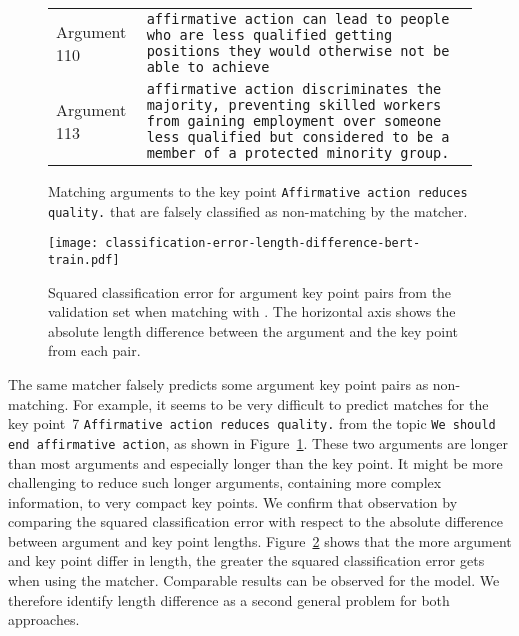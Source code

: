 \begin{figure}
    \begin{tabularx}{\linewidth}{@{}p{4em}X@{}}
        Argument 110 & \texttt{affirmative action can lead to people who are less qualified getting positions they would otherwise not be able to achieve} \\
        Argument 113 & \texttt{affirmative action discriminates the majority, preventing skilled workers from gaining employment over someone less qualified but considered to be a member of a protected minority group.}
    \end{tabularx}
    \caption{Matching arguments to the key point \texttt{Affirmative action reduces quality.} that are falsely classified as non-matching by the \BertBase matcher.}
    \label{example-5-110-113}
\end{figure}
\begin{figure}
    \texttt{[image: classification-error-length-difference-bert-train.pdf]}
    \caption{Squared classification error for argument key point pairs from the validation set when matching with \BertBase. The horizontal axis shows the absolute length difference between the argument and the key point from each pair.}
    \label{classification-error-length}
\end{figure}
The same \BertBase matcher falsely predicts some argument key point pairs as non-matching.
For example, it seems to be very difficult to predict matches for the key point~7 \texttt{Affirmative action reduces quality.} from the topic \texttt{We should end affirmative action}, as shown in Figure~\ref{example-5-110-113}. These two arguments are longer than most arguments %
and especially longer than the key point.
It might be more challenging to reduce such longer arguments, containing more complex information, to very compact key points.
We confirm that observation by comparing the squared classification error with respect to the absolute difference between argument and key point lengths.
Figure~\ref{classification-error-length} shows that the more argument and key point differ in length, the greater the squared classification error gets when using the \BertBase matcher.
Comparable results can be observed for the \Roberta model.
We therefore identify length difference as a second general problem for both approaches.


